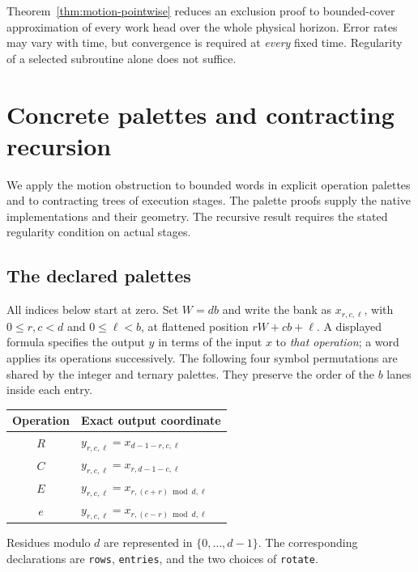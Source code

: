 Theorem~\ref{thm:motion-pointwise} reduces an exclusion proof to bounded-cover
approximation of every work head over the whole physical horizon.  Error
rates may vary with time, but convergence is required at \emph{every} fixed
time.  Regularity of a selected subroutine alone does not suffice.

\section{Concrete palettes and contracting recursion}
\label{sec:motion-applications}

We apply the motion obstruction to bounded words in explicit operation
palettes and to contracting trees of execution stages.  The palette proofs
supply the native implementations and their geometry.  The recursive result
requires the stated regularity condition on actual stages.

\subsection{The declared palettes}

All indices below start at zero.  Set $W=db$ and write the bank as
$x_{r,c,\ell}$, with $0\le r,c<d$ and $0\le\ell<b$, at flattened position
$rW+cb+\ell$.  A displayed formula specifies the output $y$ in terms of the
input $x$ to \emph{that operation}; a word applies its operations successively.
The following four symbol permutations are shared by the integer and ternary
palettes.  They preserve the order of the $b$ lanes inside each entry.
\begin{center}
\begin{tabular}{c l}
\hline
Operation & Exact output coordinate \\
\hline
$R$ & $y_{r,c,\ell}=x_{d-1-r,c,\ell}$ \\
$C$ & $y_{r,c,\ell}=x_{r,d-1-c,\ell}$ \\
$E$ & $y_{r,c,\ell}=x_{r,(c+r)\bmod d,\ell}$ \\
$e$ & $y_{r,c,\ell}=x_{r,(c-r)\bmod d,\ell}$ \\
\hline
\end{tabular}
\end{center}
Residues modulo $d$ are represented in $\{0,\ldots,d-1\}$.
The corresponding declarations are \texttt{rows}, \texttt{entries}, and the
two choices of \texttt{rotate}.

